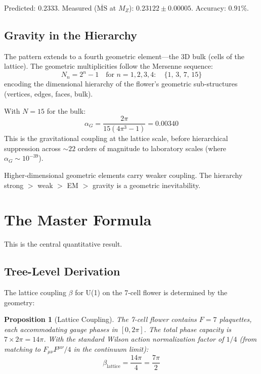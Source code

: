 \documentclass[12pt,a4paper]{article}
\theoremstyle{plain}
\newtheorem{proposition}[theorem]{Proposition}
\theoremstyle{definition}
\begin{document}
Predicted: $0.2333$. Measured ($\overline{\mathrm{MS}}$ at $M_Z$): $0.23122 \pm 0.00005$. Accuracy: $0.91\%$.

\subsection{Gravity in the Hierarchy}

The pattern extends to a fourth geometric element---the 3D bulk (cells of the lattice). The geometric multiplicities follow the Mersenne sequence:
\begin{equation}
N_n = 2^n - 1 \quad \text{for } n = 1, 2, 3, 4: \quad \{1,\, 3,\, 7,\, 15\}
\end{equation}
encoding the dimensional hierarchy of the flower's geometric sub-structures (vertices, edges, faces, bulk).

With $N = 15$ for the bulk:
\begin{equation}
\alpha_G = \frac{2\pi}{15(4\pi^3 - 1)} = 0.00340
\end{equation}
This is the gravitational coupling at the lattice scale, before hierarchical suppression across $\sim 22$ orders of magnitude to laboratory scales (where $\alpha_G \sim 10^{-39}$).

Higher-dimensional geometric elements carry weaker coupling. The hierarchy strong $>$ weak $>$ EM $>$ gravity is a geometric inevitability.

\section{The Master Formula}\label{sec:master}

This is the central quantitative result.

\subsection{Tree-Level Derivation}

The lattice coupling $\beta$ for U(1) on the 7-cell flower is determined by the geometry:

\begin{proposition}[Lattice Coupling]\label{prop:lattice-coupling}
The 7-cell flower contains $F = 7$ plaquettes, each accommodating gauge phases in $[0, 2\pi]$. The total phase capacity is $7 \times 2\pi = 14\pi$. With the standard Wilson action normalization factor of $1/4$ (from matching to $F_{\mu\nu}F^{\mu\nu}/4$ in the continuum limit):
\begin{equation}
\beta_{\mathrm{lattice}} = \frac{14\pi}{4} = \frac{7\pi}{2}
\end{equation}
\end{proposition}
\end{document}
